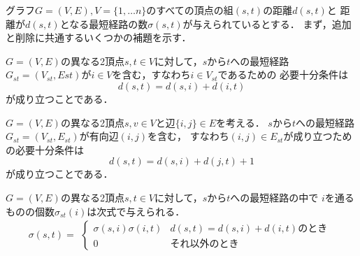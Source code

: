 グラフ$G=(V,E),V=\{1,\ldots n\}$のすべての頂点の組$(s,t)$の距離$d(s,t)$と
距離が$d(s,t)$となる最短経路の数$\sigma(s,t)$が与えられているとする．
まず，追加と削除に共通するいくつかの補題を示す．
\begin{lemma-without-proof}
  $G=(V,E)$の異なる2頂点$s,t\in V$に対して，$s$から$t$への最短経路
  $G_{st}=(V_{st},E{st})$が$i\in V$を含む，すなわち$i\in V_{st}$であるための
  必要十分条件は
  \[ d(s,t)=d(s,i)+d(i,t) \]
  が成り立つことである．
\end{lemma-without-proof}
\begin{lemma-without-proof}
  $G=(V,E)$の異なる2頂点$s,v\in V$と辺$\{i,j\}\in E$を考える．
  $s$から$t$への最短経路$G_{st}=(V_{st},E_{st})$が有向辺$(i,j)$を含む，
  すなわち$(i,j)\in E_{st}$が成り立つための必要十分条件は
  \[ d(s,t)=d(s,i)+d(j,t)+1 \]
  が成り立つことである．
\end{lemma-without-proof}
\begin{lemma-without-proof}
  $G=(V,E)$の異なる2頂点$s,t\in V$に対して，$s$から$t$への最短経路の中で
  $i$を通るものの個数$\sigma_{st}(i)$は次式で与えられる．
  \[ \sigma(s,t)=\begin{aligned}\begin{cases}
    \sigma(s,i)\sigma(i,t) & d(s,t)=d(s,i)+d(i,t)\mathrm{のとき} \\
    0 & \mathrm{それ以外のとき}
  \end{cases}\end{aligned} \]
\end{lemma-without-proof}

